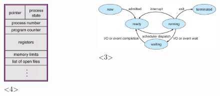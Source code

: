 \documentclass[10pt, xcolor=x11names]{beamer}
\begin{document}
\begin{frame}
\begin{columns}
			\begin{figure}
			\centering
				\includegraphics[width=.6\linewidth]{img/pcb.png}<4>
			\end{figure}
			\begin{figure}
			\centering
				\includegraphics[width=1.1\linewidth]{img/process_states.png}<3>
			\end{figure}
			
	\end{columns}
	
\end{frame}
\end{document}
